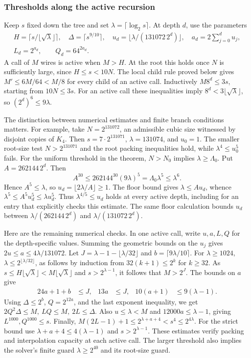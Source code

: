 \documentclass[
  11pt,
]{article}
\newcommand{\floor}[1]{\lfloor #1\rfloor}
\newcommand{\ceil}[1]{\lceil #1\rceil}
\begin{document}
\subsubsection*{Thresholds along the active recursion}

Keep \(s\) fixed down the tree and set \(\lambda=\ceil{\log_2 s}\).
At depth \(d\), use the parameters
\[
\begin{gathered}
 H=\ceil{s/\floor{\sqrt{\lambda}}},\quad
 \Delta=\ceil{s^{9/10}},\quad
 u_d=\floor{\lambda/(131072\,2^d)},\quad
 a_d=2\sum_{j=0}^d u_j,\\
 L_d=2^{a_d},\qquad Q_d=64^{2a_d}.
\end{gathered}
\]
A call of \(M\) wires is active when \(M>H\). At the root this holds
once \(N\) is sufficiently large, since \(H\le s<10N\). The local
child rule proved below gives \(M'\le 6M/64<M/8\) for every child of an
active call. Inductively \(M8^d\le3s\), starting from \(10N\le3s\).
For an active call these inequalities imply
\(8^d<3\floor{\sqrt{\lambda}}\), so \((2^d)^6\le9\lambda\).

The distinction between numerical estimates and finite branch
conditions matters. For example, take \(N=2^{131072}\), an admissible
cubic size witnessed by disjoint copies of \(K_4\). Then
\(s=7\cdot2^{131071}\), \(\lambda=131074\), and \(u_0=1\).
The smaller root-size test \(N>2^{131071}\) and the root packing
inequalities hold, while \(\lambda^4\le u_0^5\) fails.
For the uniform threshold in the theorem, \(N>N_0\) implies
\(\lambda\ge\Lambda_0\). Put \(A=262144\,2^d\). Then
\[
 A^{30}\le 262144^{30}(9\lambda)^5
           =\Lambda_0\lambda^5\le\lambda^6 .
\]
Hence \(A^5\le\lambda\), so \(u_d=\floor{2\lambda/A}\ge1\).
The floor bound gives \(\lambda\le A u_d\), whence
\(\lambda^5\le A^5 u_d^5\le\lambda u_d^5\).
Thus \(\lambda^{4/5}\le u_d\) holds at every active depth, including
for an entry that explicitly checks this estimate. The same floor
calculation bounds \(u_d\) between
\(\lambda/(262144\,2^d)\) and \(\lambda/(131072\,2^d)\).

Here are the remaining numerical checks. In one active call,
write \(u,a,L,Q\) for the depth-specific values. Summing the
geometric bounds on the \(u_j\) gives \(2u\le a\le4\lambda/131072\).
Let \(J=\lambda-1-\floor{\lambda/32}\) and
\(b=\ceil{9\lambda/10}\). For \(\lambda\ge1024\),
\(\lambda\le 2^{\floor{\lambda/32}}\), as follows by induction from
\(32(k+1)\le2^k\) for \(k\ge32\).
As \(s\le H\floor{\sqrt{\lambda}}<M\floor{\sqrt{\lambda}}\)
and \(s>2^{\lambda-1}\), it follows that \(M>2^J\).
The bounds on \(a\) give
\[
\begin{aligned}
 24a+1+b &\le J, & 13a &\le J, &
 10(a+1)&\le9(\lambda-1).
\end{aligned}
\]
Using \(\Delta\le2^b\), \(Q=2^{12a}\), and the last exponent
inequality, we get \(2Q^2\Delta\le M,\ LQ\le M,\ 2L\le\Delta\).
Also \(u\le\lambda<M\) and \(12000a\le\lambda-1\), giving \(L^{1000},Q^{1000}\le s\). Finally,
\(M(2L-1)+1\le2^{\lambda+a+4}<s^4\le2^{4\lambda}\).
For the strict bound use \(\lambda+a+4\le4(\lambda-1)\) and
\(s>2^{\lambda-1}\). These estimates verify packing and interpolation
capacity at each active call. The larger threshold also implies the
solver's finite guard \(\lambda\ge2^{40}\) and its root-size guard.
\end{document}
